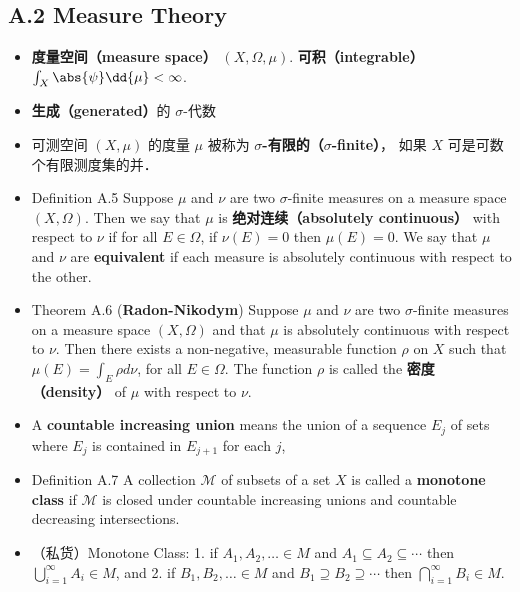 
\subsection{A.2 Measure Theory}

\begin{itemize}
\item \textbf{度量空间（measure space）} $(X,\Omega,\mu)$. \textbf{可积（integrable）} $\int_X \abs{\psi} \dd{\mu} < \infty$.

\item \textbf{生成（generated）}的 $\sigma$-代数

\item 可测空间 $(X, \mu)$ 的度量 $\mu$ 被称为 \textbf{$\sigma$-有限的（$\sigma$-finite）}， 如果 $X$ 可是可数个有限测度集的并．

\item Definition A.5 Suppose $\mu$ and $\nu$ are two $\sigma$-finite measures on a measure space $(X, \Omega)$. Then we say that $\mu$ is \textbf{绝对连续（absolutely continuous）} with respect to $\nu$ if for all $E \in \Omega$, if $\nu(E)=0$ then $\mu(E)=0$. We say that $\mu$ and $\nu$ are \textbf{equivalent} if each measure is absolutely continuous with respect to the other.

\item Theorem A.6 (\textbf{Radon-Nikodym}) Suppose $\mu$ and $\nu$ are two $\sigma$-finite measures on a measure space $(X, \Omega)$ and that $\mu$ is absolutely continuous with respect to $\nu$. Then there exists a non-negative, measurable function $\rho$ on $X$ such that $\mu(E)=\int_{E} \rho d \nu$, for all $E \in \Omega$. The function $\rho$ is called the \textbf{密度（density）} of $\mu$ with respect to $\nu$.

\item A \textbf{countable increasing union} means the union of a sequence $E_j$ of sets
where $E_j$ is contained in $E_{j+1}$ for each $j$,

\item Definition A.7 A collection $\mathcal{M}$ of subsets of a set $X$ is called a \textbf{monotone class} if $\mathcal{M}$ is closed under countable increasing unions and countable decreasing intersections.

\item （私货）Monotone Class: 1. if $A_{1}, A_{2}, \ldots \in M$ and $A_{1} \subseteq A_{2} \subseteq \cdots$ then $\bigcup_{i=1}^{\infty} A_{i} \in M$, and 2. if $B_{1}, B_{2}, \ldots \in M$ and $B_{1} \supseteq B_{2} \supseteq \cdots$ then $\bigcap_{i=1}^{\infty} B_{i} \in M$.


\end{itemize}
